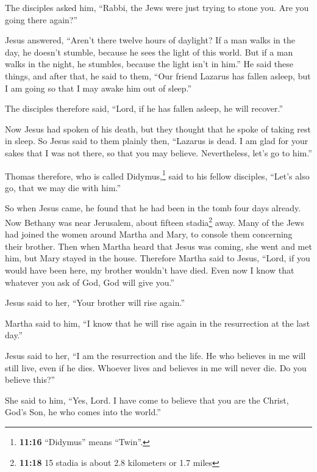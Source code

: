  The disciples asked him, ``Rabbi, the Jews were just
trying to stone you. Are you going there again?''

 Jesus answered, ``Aren't there twelve hours of daylight?
If a man walks in the day, he doesn't stumble, because he sees the light
of this world.  But if a man walks in the night, he
stumbles, because the light isn't in him.''  He said
these things, and after that, he said to them, ``Our friend Lazarus has
fallen asleep, but I am going so that I may awake him out of sleep.''

 The disciples therefore said, ``Lord, if he has fallen
asleep, he will recover.''

 Now Jesus had spoken of his death, but they thought that
he spoke of taking rest in sleep.  So Jesus said to them
plainly then, ``Lazarus is dead.  I am glad for your
sakes that I was not there, so that you may believe. Nevertheless, let's
go to him.''

 Thomas therefore, who is called Didymus,\footnote{\textbf{11:16}
  ``Didymus'' means ``Twin''.} said to his fellow disciples, ``Let's
also go, that we may die with him.''

 So when Jesus came, he found that he had been in the
tomb four days already.  Now Bethany was near Jerusalem,
about fifteen stadia\footnote{\textbf{11:18} 15 stadia is about 2.8
  kilometers or 1.7 miles} away.  Many of the Jews had
joined the women around Martha and Mary, to console them concerning
their brother.  Then when Martha heard that Jesus was
coming, she went and met him, but Mary stayed in the house.
 Therefore Martha said to Jesus, ``Lord, if you would
have been here, my brother wouldn't have died.  Even now
I know that whatever you ask of God, God will give you.''

 Jesus said to her, ``Your brother will rise again.''

 Martha said to him, ``I know that he will rise again in
the resurrection at the last day.''

 Jesus said to her, ``I am the resurrection and the life.
He who believes in me will still live, even if he dies. 
Whoever lives and believes in me will never die. Do you believe this?''

 She said to him, ``Yes, Lord. I have come to believe
that you are the Christ, God's Son, he who comes into the world.''

